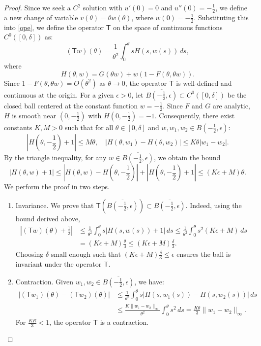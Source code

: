 \documentclass[a4paper,12pt]{amsart}
\theoremstyle{plain}
\theoremstyle{definition}
\begin{document}
\begin{proof}
 
Since we seek a $C^2$ solution with $u'(0)=0$ and $u''(0)=-\frac12$, we define a new change of variable $v(\theta) = \theta w(\theta)$, where $w(0)=-\frac12$. Substituting this into \eqref{ope}, we define the operator $\mathsf{T}$ on the space of continuous functions $C^0([0, \delta])$ as:
\begin{equation*}
 (\mathsf{T}w)(\theta) = \frac{1}{\theta^2} \int_0^\theta s H(s, w(s)) \, ds,
\end{equation*}
where 
$$H(\theta, w) = G(\theta w) + w(1 - F(\theta, \theta w)).$$
Since $1 - F(\theta, \theta w) = O(\theta^2)$ as $\theta \to 0$, the operator $\mathsf{T}$ is well-defined and continuous at the origin.  For a given $\epsilon > 0$, let $\overline{B(-\frac12, \epsilon)} \subset C^0([0, \delta])$ be the closed ball centered at the constant function $w =- \frac12$. Since $F$ and $G$ are analytic, $H$ is smooth near $(0, -\frac12)$ with $H(0, -\frac12) = -1$. Consequently, there exist constants $K, M > 0$ such that for all $\theta \in [0, \delta]$ and $w, w_1, w_2 \in \overline{B(-\frac12, \epsilon)}$:
$$
|H(\theta, -\frac12) +1| \leq M\theta, \quad |H(\theta, w_1) - H(\theta, w_2)| \leq K \theta |w_1 - w_2|.
$$
By the triangle inequality, for any $w \in \overline{B(-\frac12, \epsilon)}$, we obtain the bound 
$$|H(\theta, w) +1| \leq |H(\theta, w) - H(\theta, -\frac12)| + |H(\theta, -\frac12) +1| \leq (K\epsilon + M)\theta.$$
 We perform the proof in two steps.

\begin{enumerate}
 \item Invariance. We prove that $\mathsf{T}(\overline{B(-\frac12, \epsilon)}) \subset \overline{B(-\frac12, \epsilon)}$. Indeed, using the bound derived above,
 \begin{equation*}
 \begin{split}
 |(\mathsf{T}w)(\theta) +\frac12| &\leq \frac{1}{\theta^2} \int_0^\theta s |H(s, w(s)) +1| \, ds \leq \frac{1}{\theta^2} \int_0^\theta s^2 (K\epsilon + M) \, ds \\
 &= (K\epsilon + M)\frac{\theta}{3} \leq (K\epsilon + M)\frac{\delta}{3}.
 \end{split}
 \end{equation*}
 Choosing $\delta$ small enough such that  $(K\epsilon + M)\frac{\delta}{3} \leq \epsilon$ ensures the ball is invariant under the operator $\mathsf{T}$.
 
 \item Contraction.   Given $w_1, w_2 \in \overline{B(-\frac12, \epsilon)}$, we have:
 \begin{equation*}
 \begin{split}
 |(\mathsf{T}w_1)(\theta) - (\mathsf{T}w_2)(\theta)| &\leq \frac{1}{\theta^2} \int_0^\theta s |H(s, w_1(s)) - H(s, w_2(s))| \, ds \\
 &\leq \frac{K \|w_1 - w_2\|_\infty}{\theta^2} \int_0^\theta s^2 \, ds = \frac{K \theta}{3} \|w_1 - w_2\|_\infty.
 \end{split}
 \end{equation*}
 For $\frac{K R}{3} < 1$, the operator $\mathsf{T}$ is a contraction.
\end{enumerate}
 

\end{proof}
\end{document}

